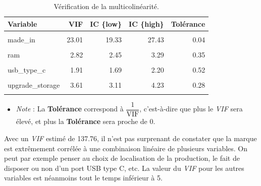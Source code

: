 \documentclass[
  12pt,
]{report}
\providecommand{\tightlist}{%
  \setlength{\itemsep}{0pt}\setlength{\parskip}{0pt}}\usepackage{longtable,booktabs,array}
\begin{document}
\begin{table}[!h]

\caption{\label{tab:collinearity_level}Vérification de la multicolinéarité.}
\centering
\begin{tabular}[t]{lrrrr}
\toprule
\textbf{Variable} & \textbf{VIF} & \textbf{IC \{low\}} & \textbf{IC \{high\}} & \textbf{Tolérance}\\
\midrule
\cellcolor{gray!6}{brand} & \cellcolor{gray!6}{137.76} & \cellcolor{gray!6}{115.29} & \cellcolor{gray!6}{164.65} & \cellcolor{gray!6}{0.01}\\
made\_in & 23.01 & 19.33 & 27.43 & 0.04\\
\cellcolor{gray!6}{storage} & \cellcolor{gray!6}{1.99} & \cellcolor{gray!6}{1.76} & \cellcolor{gray!6}{2.30} & \cellcolor{gray!6}{0.50}\\
ram & 2.82 & 2.45 & 3.29 & 0.35\\
\cellcolor{gray!6}{screen\_type} & \cellcolor{gray!6}{3.26} & \cellcolor{gray!6}{2.82} & \cellcolor{gray!6}{3.82} & \cellcolor{gray!6}{0.31}\\
\addlinespace
usb\_type\_c & 1.91 & 1.69 & 2.20 & 0.52\\
\cellcolor{gray!6}{battery} & \cellcolor{gray!6}{2.41} & \cellcolor{gray!6}{2.10} & \cellcolor{gray!6}{2.79} & \cellcolor{gray!6}{0.42}\\
upgrade\_storage & 3.61 & 3.11 & 4.23 & 0.28\\
\cellcolor{gray!6}{induction} & \cellcolor{gray!6}{3.80} & \cellcolor{gray!6}{3.27} & \cellcolor{gray!6}{4.45} & \cellcolor{gray!6}{0.26}\\
\bottomrule
\end{tabular}
\end{table}

\begin{itemize}
\tightlist
\item
  \emph{Note} : La \textbf{Tolérance} correspond à
  \(\dfrac{1}{\text{VIF}}\), c'est-à-dire que plus le \emph{VIF} sera
  élevé, et plus la \textbf{Tolérance} sera proche de 0.
\end{itemize}

Avec un \emph{VIF} estimé de 137.76, il n'est pas surprenant de
constater que la marque est extrêmement corrélée à une combinaison
linéaire de plusieurs variables. On peut par exemple penser au choix de
localisation de la production, le fait de disposer ou non d'un port USB
type C, etc. La valeur du \emph{VIF} pour les autres variables est
néanmoins tout le temps inférieur à 5.
\end{document}
